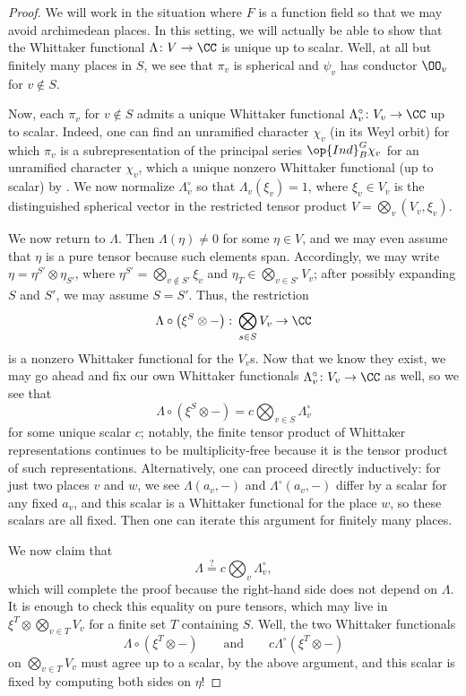 \documentclass[../notes.tex]{subfiles}
\begin{document}
\begin{proof}
	We will work in the situation where $F$ is a function field so that we may avoid archimedean places. In this setting, we will actually be able to show that the Whittaker functional $\Lambda\colon V\to\CC$ is unique up to scalar. Well, at all but finitely many places in $S$, we see that $\pi_v$ is spherical and $\psi_v$ has conductor $\OO_v$ for $v\notin S$.

	Now, each $\pi_v$ for $v\notin S$ admits a unique Whittaker functional $\Lambda_v^\circ\colon V_v\to\CC$ up to scalar. Indeed, one can find an unramified character $\chi_v$ (in its Weyl orbit) for which $\pi_v$ is a subrepresentation of the principal series $\op{Ind}_B^G\chi_v$ for an unramified character $\chi_v$, which a unique nonzero Whittaker functional (up to scalar) by . We now normalize $\Lambda_v^\circ$ so that $\Lambda_v(\xi_v)=1$, where $\xi_v\in V_v$ is the distinguished spherical vector in the restricted tensor product $V=\bigotimes_v(V_v,\xi_v)$.

	We now return to $\Lambda$. Then $\Lambda(\eta)\ne0$ for some $\eta\in V$, and we may even assume that $\eta$ is a pure tensor because such elements span. Accordingly, we may write $\eta=\eta^{S'}\otimes\eta_{S'}$, where $\eta^{S'}=\bigotimes_{v\notin S'}\xi_v$ and $\eta_T\in\bigotimes_{v\in S'}V_v$; after possibly expanding $S$ and $S'$, we may assume $S=S'$. Thus, the restriction
	\[\Lambda\circ\left(\xi^S\otimes-\right)\colon\bigotimes_{s\in S}V_v\to\CC\]
	is a nonzero Whittaker functional for the $V_v$s. Now that we know they exist, we may go ahead and fix our own Whittaker functionals $\Lambda_v^\circ\colon V_v\to\CC$ as well, so we see that
	\[\Lambda\circ\left(\xi^S\otimes-\right)=c\bigotimes_{v\in S}\Lambda_v^\circ\]
	for some unique scalar $c$; notably, the finite tensor product of Whittaker representations continues to be multiplicity-free because it is the tensor product of such representations. Alternatively, one can proceed directly inductively: for just two places $v$ and $w$, we see $\Lambda(a_v,-)$ and $\Lambda^\circ(a_v,-)$ differ by a scalar for any fixed $a_v$, and this scalar is a Whittaker functional for the place $w$, so these scalars are all fixed. Then one can iterate this argument for finitely many places.

	We now claim that
	\[\Lambda\stackrel?=c\bigotimes_v\Lambda_v^\circ,\]
	which will complete the proof because the right-hand side does not depend on $\Lambda$. It is enough to check this equality on pure tensors, which may live in $\xi^T\otimes\bigotimes_{v\in T}V_v$ for a finite set $T$ containing $S$. Well, the two Whittaker functionals
	\[\Lambda\circ\left(\xi^T\otimes-\right)\qquad\text{and}\qquad c\Lambda^\circ\left(\xi^T\otimes-\right)\]
	on $\bigotimes_{v\in T}V_v$ must agree up to a scalar, by the above argument, and this scalar is fixed by computing both sides on $\eta$!
\end{proof}
\end{document}
